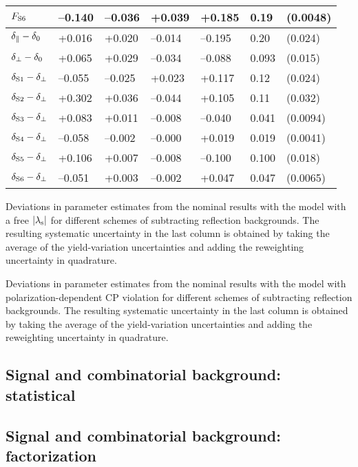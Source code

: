 \begin{table}[htbp]
\begin{tabular}{lllllll}
    $\FS[6]$             &  --0.140    &  --0.036  &   +0.039  &   +0.185  &  0.19   &  (0.0048)                     \\
    \hline
    $\delpar-\delzero$   &   +0.016    &   +0.020  &  --0.014  &  --0.195  &  0.20   &  (0.024)                      \\
    $\delperp-\delzero$  &   +0.065    &   +0.029  &  --0.034  &  --0.088  &  0.093  &  (0.015)                      \\
    $\delS[1]-\delperp$  &  --0.055    &  --0.025  &   +0.023  &   +0.117  &  0.12   &  (0.024)                      \\
    $\delS[2]-\delperp$  &   +0.302    &   +0.036  &  --0.044  &   +0.105  &  0.11   &  (0.032)                      \\
    $\delS[3]-\delperp$  &   +0.083    &   +0.011  &  --0.008  &  --0.040  &  0.041  &  (0.0094)                     \\
    $\delS[4]-\delperp$  &  --0.058    &  --0.002  &  --0.000  &   +0.019  &  0.019  &  (0.0041)                     \\
    $\delS[5]-\delperp$  &   +0.106    &   +0.007  &  --0.008  &  --0.100  &  0.100  &  (0.018)                      \\
    $\delS[6]-\delperp$  &  --0.051    &   +0.003  &  --0.002  &   +0.047  &  0.047  &  (0.0065)                     \\
    \hline
  \end{tabular}
\end{table}

\begin{table}[htbp]
  \centering
  \caption{Deviations in parameter estimates from the nominal results with the model with a free $\lamsAbs$ for different schemes of
           subtracting reflection backgrounds. The resulting systematic uncertainty in the last column is obtained by taking the average of
           the yield-variation uncertainties and adding the reweighting uncertainty in quadrature.}
  \label{tab:syst_mass_peaking_lamb_phi}
\end{table}

\begin{table}[htbp]
  \centering
  \caption{Deviations in parameter estimates from the nominal results with the model with polarization-dependent CP violation for
           different schemes of subtracting reflection backgrounds. The resulting systematic uncertainty in the last column is obtained by
           taking the average of the yield-variation uncertainties and adding the reweighting uncertainty in quadrature.}
  \label{tab:syst_mass_peaking_polarDep}
\end{table}

\subsection{Signal and combinatorial background: statistical}
\label{subsec:syst_mass_stat}

\subsection{Signal and combinatorial background: factorization}
\label{subsec:syst_mass_factor}
